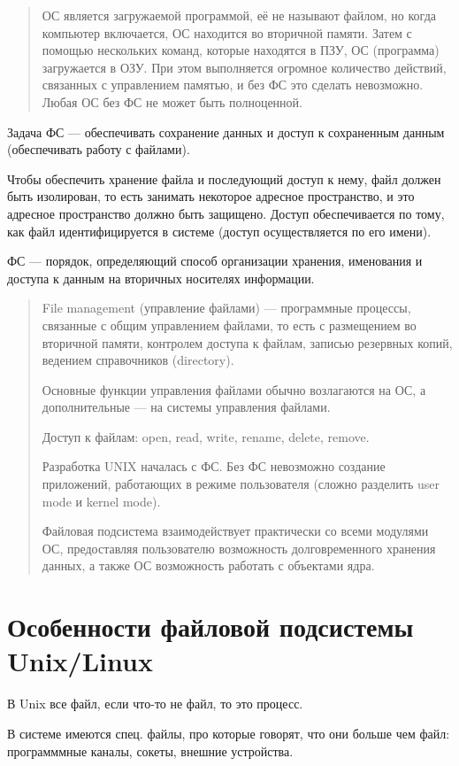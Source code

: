 \begin{quote}
	ОС является загружаемой программой, её не называют файлом, но когда компьютер включается, ОС находится во вторичной памяти. Затем с помощью нескольких команд, которые находятся в ПЗУ, ОС (программа) загружается в ОЗУ. При этом выполняется огромное количество действий, связанных с управлением памятью, и без ФС это сделать невозможно. Любая ОС без ФС не может быть полноценной.
\end{quote}

Задача ФС --- обеспечивать сохранение данных и доступ к сохраненным данным (обеспечивать работу с файлами).

Чтобы обеспечить хранение файла и последующий доступ к нему, файл должен быть изолирован, то есть занимать некоторое адресное пространство, и это адресное пространство должно быть защищено. Доступ обеспечивается по тому, как файл идентифицируется в системе (доступ осуществляется по его имени).

ФС --- порядок, определяющий способ организации хранения, именования и доступа к данным на вторичных носителях информации.

\begin{quote}
	File management (управление файлами) --- программные процессы, связанные с общим управлением файлами, то есть с размещением во вторичной памяти, контролем доступа к файлам, записью резервных копий, ведением справочников (directory).
	
	Основные функции управления файлами обычно возлагаются на ОС, а дополнительные --- на системы управления файлами.
	
	Доступ к файлам: open, read, write, rename, delete, remove.
	
	Разработка UNIX началась с ФС. Без ФС невозможно создание приложений, работающих в режиме пользователя (сложно разделить user mode и kernel mode).
	
	Файловая подсистема взаимодействует практически со всеми модулями ОС, предоставляя пользователю возможность долговременного хранения данных, а также ОС возможность работать с объектами ядра.
\end{quote}

\section{Особенности файловой подсистемы \\ Unix/Linux}
В Unix все файл, если что-то не файл, то это процесс.

В системе имеются спец. файлы, про которые говорят, что они больше чем файл: программмные каналы, сокеты, внешние устройства.

